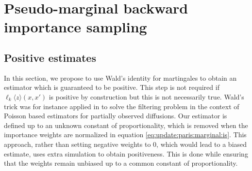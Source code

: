 \documentclass[12pt]{article}
\newcommand{\hatqg}[1]{\mathsf{\ell}_{#1}}
\begin{document}
\section{Pseudo-marginal backward importance sampling}
\label{sec:backwardis}

\subsection{Positive estimates}
\label{sec:wald:trick}
In this section, we propose to use Wald’s identity for martingales to obtain an  estimator which is guaranteed to be positive.  This step is not required if $\hatqg{k}\langle z\rangle(x,x')$ is positive by construction but this is not necessarily true.
 Wald's trick was for instance applied in \cite{fearnhead2010random} to solve the filtering problem in the context of Poisson based estimators for partially observed diffusions. Our estimator is defined up to an unknown constant of proportionality, which is removed when the importance weights are normalized in equation \eqref{eq:update:paris:marginal:is}. 
This approach, rather than setting negative weights to 0, which would lead to a biased estimate, uses extra simulation to obtain positiveness. 
This is done while ensuring that the weights remain unbiased up to a common constant of proportionality.
\end{document}
